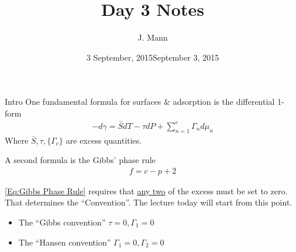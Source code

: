 \documentclass{article}
\date{3 September, 2015}
\author{J. Mann}
\title{Day 3 Notes}
\date{September 3, 2015}
\begin{document}
\maketitle{}
\begin{section}{Intro}
  One fundamental formula for surfaces \& adsorption is the differential 1-form
  \begin{align}
    -d\gamma = \bar{S} dT - \tau dP + \sum_{n=1}^e \Gamma_n d\mu_n
    \label{Eq:differential 1-form}
  \end{align}
  Where $\bar{S}, \tau, \{ \Gamma_c\}$ are excess quantities.
  
  A second  formula is the Gibbs' phase rule
 \begin{align}
 f = c - p + 2    
    \label{Eq:Gibbs Phase Rule}
  \end{align}

  \eqref{Eq:Gibbs Phase Rule} requires that \underline{any two} of the excess must be set to zero. That determines the ``Convention''. The lecture today will start from this point. 
  
  \begin{itemize}
    \item The ``Gibbs convention'' $\tau = 0, \Gamma_1 = 0$
    \item The ``Hansen convention'' $\Gamma_1 = 0, \Gamma_2 = 0$
  \end{itemize}

\end{section}
\end{document}
